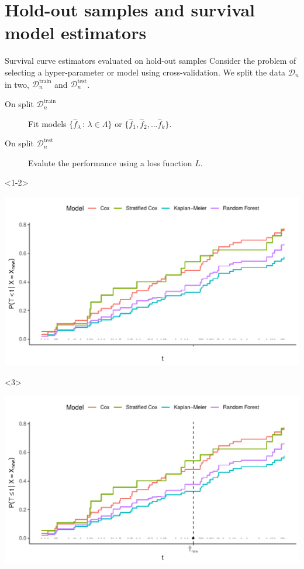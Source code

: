 \documentclass[smaller]{beamer}\usepackage{listings}
\begin{document}
\section{Hold-out samples and survival model estimators}
\label{sec:org4d6915d}
\begin{frame}[label={sec:orgf262b13}]{Survival curve estimators evaluated on hold-out samples}
\small Consider the problem of selecting a hyper-parameter or model using cross-validation.
We split the data \(\mathcal{D}_n\) in two, \(\mathcal{D}_n^{\mathrm{train}}\) and \(\mathcal{D}_n^{\mathrm{test}}\).
\begin{description}
\item[{On split \(\mathcal{D}_n^{\mathrm{train}}\)}] Fit models \(\{\hat f_{\lambda} \, : \, \lambda \in \Lambda\}\) or
\(\{\hat f_1, \hat f_2, \dots \hat f_k\}\).
\item[{On split \(\mathcal{D}_n^{\mathrm{test}}\)}] Evalute the performance using a loss function \(L\).
\end{description}

\begin{onlyenv}<1-2>
\pause

\begin{center}
\includegraphics[width=.9\linewidth]{fig-hold-out-sample.pdf}
\end{center}
\end{onlyenv}

\begin{onlyenv}<3>
\begin{center}
\includegraphics[width=.9\linewidth]{fig-hold-out-sample2.pdf}
\end{center}
\end{onlyenv}
\end{frame}
\end{document}
